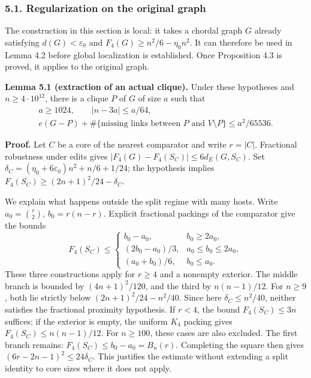 \documentclass[english,11pt,a4paper]{article}
\newcounter{none}
\begin{document}
\subsubsection{5.1. Regularization on the original graph}\label{regularization-on-the-original-graph}

The construction in this section is local: it takes a chordal graph \(G\) already satisfying \(d(G)<\varepsilon_0\) and \(F_4(G)\ge n^2/6-\eta_0n^2\). It can therefore be used in Lemma 4.2 before global localization is established. Once Proposition 4.3 is proved, it applies to the original graph.


\textbf{Lemma 5.1 (extraction of an actual clique).} Under these hypotheses and \(n\ge4\cdot10^{12}\), there is a clique \(P\) of \(G\) of size \(a\) such that \[
\begin{gathered}
a\ge1024,\qquad |n-3a|\le a/64,\\
e(G-P)+\#\{\text{missing links between }P\text{ and }V\setminus P\}
\le a^2/65536.
\end{gathered}
\tag{5.1}
\]

\textbf{Proof.} Let \(C\) be a core of the nearest comparator and write \(r=|C|\). Fractional robustness under edits gives \(|F_4(G)-F_4(S_C)|\le6d_E(G,S_C)\). Set \(\delta_C=(\eta_0+6\varepsilon_0)n^2+n/6+1/24\); the hypothesis implies \(F_4(S_C)\ge(2n+1)^2/24-\delta_C\).

We explain what happens outside the split regime with many hosts. Write \(a_0=\binom r2\), \(b_0=r(n-r)\). Explicit fractional packings of the comparator give the bounds \[
F_4(S_C)\le
\begin{cases}
b_0-a_0,&b_0\ge2a_0,\\
(2b_0-a_0)/3,&a_0\le b_0\le2a_0,\\
(a_0+b_0)/6,&b_0\le a_0.
\end{cases}
\tag{5.1a}
\] These three constructions apply for \(r\ge4\) and a nonempty exterior. The middle branch is bounded by \((4n+1)^2/120\), and the third by \(n(n-1)/12\). For \(n\ge9\), both lie strictly below \((2n+1)^2/24-n^2/40\). Since here \(\delta_C\le n^2/40\), neither satisfies the fractional proximity hypothesis. If \(r<4\), the bound \(F_4(S_C)\le3n\) suffices; if the exterior is empty, the uniform \(K_4\) packing gives \(F_4(S_C)\le n(n-1)/12\). For \(n\ge100\), these cases are also excluded. The first branch remains: \(F_4(S_C)\le b_0-a_0=B_n(r)\). Completing the square then gives \((6r-2n-1)^2\le24\delta_C\). This justifies the estimate without extending a split identity to core sizes where it does not apply.
\end{document}
